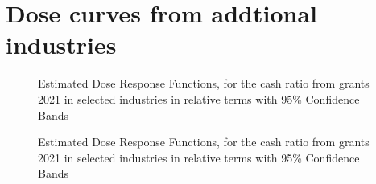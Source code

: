 \section{Dose curves from addtional industries}

\begin{figure}
    \centering
    
    \decoRule
    \caption[Response curves for liquidity through aid - by sectors 2]{Estimated Dose Response Functions, for the cash ratio from grants 2021 in selected industries in relative terms with 95\% Confidence Bands}
    \label{fig:Curve5}
\end{figure}

\begin{figure}
    \centering
    
    \decoRule
    \caption[Response curves for liquidity through aid - by sectors 2 uncut]{Estimated Dose Response Functions, for the cash ratio from grants 2021 in selected industries in relative terms with 95\% Confidence Bands}
    \label{fig:Curve5raw}
\end{figure}